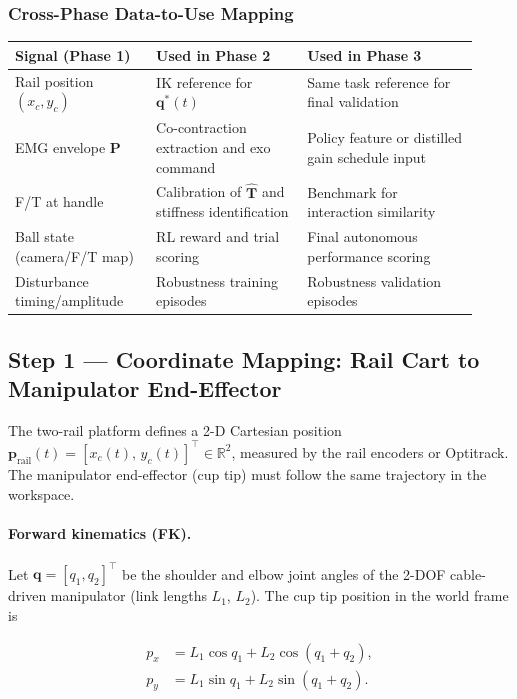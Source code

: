 \documentclass[11pt, a4paper]{article}
\newcommand{\bq}{\bm{q}}
\begin{document}
\subsubsection{Cross-Phase Data-to-Use Mapping}
\begin{center}
{\small
\begin{tabular}{p{0.28\linewidth}p{0.30\linewidth}p{0.34\linewidth}}
\toprule
\textbf{Signal (Phase 1)} & \textbf{Used in Phase 2} & \textbf{Used in Phase 3} \\
\midrule
Rail position $(x_c,y_c)$ & IK reference for $\bq^*(t)$ & Same task reference for final validation \\
EMG envelope $\mathbf P$ & Co-contraction extraction and exo command & Policy feature or distilled gain schedule input \\
F/T at handle & Calibration of $\hat{\mathbf T}$ and stiffness identification & Benchmark for interaction similarity \\
Ball state (camera/F/T map) & RL reward and trial scoring & Final autonomous performance scoring \\
Disturbance timing/amplitude & Robustness training episodes & Robustness validation episodes \\
\bottomrule
\end{tabular}}
\end{center}

\subsection{Step 1 --- Coordinate Mapping: Rail Cart to Manipulator End-Effector}

The two-rail platform defines a 2-D Cartesian position
$\bm{p}_{\text{rail}}(t) = [x_c(t),\, y_c(t)]^\top \in \mathbb{R}^2$,
measured by the rail encoders or Optitrack.  The manipulator
end-effector (cup tip) must follow the same trajectory in the workspace.

\paragraph{Forward kinematics (FK).}
Let $\bq = [q_1, q_2]^\top$ be the shoulder and elbow joint angles of
the 2-DOF cable-driven manipulator (link lengths $L_1$, $L_2$).
The cup tip position in the world frame is

\begin{align}
  p_x &= L_1 \cos q_1 + L_2 \cos(q_1 + q_2), \\
  p_y &= L_1 \sin q_1 + L_2 \sin(q_1 + q_2).
\end{align}
\end{document}
